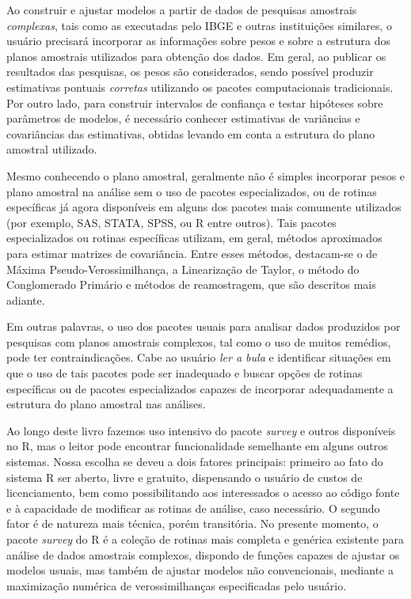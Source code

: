 \documentclass[
  12pt,
  brazilian,
]{book}
\theoremstyle{definition}
\theoremstyle{definition}
\theoremstyle{definition}
\theoremstyle{definition}
\theoremstyle{remark}
\begin{document}
Ao construir e ajustar modelos a partir de dados de pesquisas amostrais
\emph{complexas}, tais como as executadas pelo IBGE e outras instituições similares,
o usuário precisará incorporar as informações sobre pesos e sobre a estrutura dos
planos amostrais utilizados para obtenção dos dados. Em geral, ao publicar os resultados das pesquisas, os pesos são considerados, sendo possível produzir estimativas pontuais \emph{corretas} utilizando os pacotes computacionais tradicionais. Por outro lado, para construir intervalos de confiança e testar hipóteses sobre parâmetros de modelos, é necessário conhecer estimativas de variâncias e covariâncias das
estimativas, obtidas levando em conta a estrutura do plano amostral utilizado.

Mesmo conhecendo o plano amostral, geralmente não é simples incorporar pesos e
plano amostral na análise sem o uso de pacotes especializados, ou de rotinas
específicas já agora disponíveis em alguns dos pacotes mais comumente utilizados
(por exemplo, SAS, STATA, SPSS, ou R entre outros). Tais pacotes especializados
ou rotinas específicas utilizam, em geral, métodos aproximados para estimar
matrizes de covariância. Entre esses métodos, destacam-se o de Máxima
Pseudo-Verossimilhança, a Linearização de Taylor, o método do Conglomerado Primário e métodos de reamostragem, que são descritos mais adiante.

Em outras palavras, o uso dos pacotes usuais para analisar dados produzidos por
pesquisas com planos amostrais complexos, tal como o uso de muitos remédios,
pode ter contraindicações. Cabe ao usuário \emph{ler a bula} e identificar situações
em que o uso de tais pacotes pode ser inadequado e buscar opções de rotinas
específicas ou de pacotes especializados capazes de incorporar adequadamente a
estrutura do plano amostral nas análises.

Ao longo deste livro fazemos uso intensivo do pacote \emph{survey} e outros disponíveis no R, mas o leitor pode encontrar funcionalidade semelhante em alguns outros sistemas.
Nossa escolha se deveu a dois fatores principais: primeiro ao fato do sistema R
ser aberto, livre e gratuito, dispensando o usuário de custos de licenciamento,
bem como possibilitando aos interessados o acesso ao código fonte e à capacidade
de modificar as rotinas de análise, caso necessário. O segundo fator é de
natureza mais técnica, porém transitória. No presente momento, o pacote \emph{survey}
do R é a coleção de rotinas mais completa e genérica existente para análise de dados amostrais complexos, dispondo de funções capazes de ajustar os modelos usuais, mas também de ajustar modelos não convencionais, mediante a maximização numérica de verossimilhanças especificadas pelo usuário.
\end{document}

